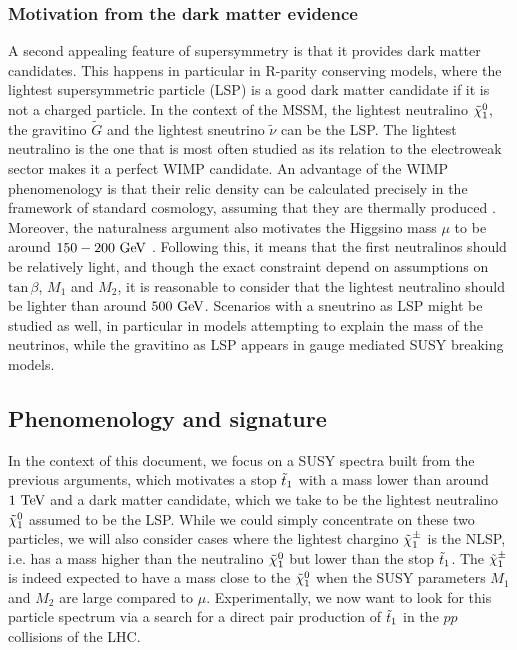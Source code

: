     \subsubsection{Motivation from the dark matter evidence}

    A second appealing feature of supersymmetry is that it provides dark matter
    candidates. This happens in particular in R-parity conserving models, where the
    lightest supersymmetric particle (LSP) is a good dark matter candidate if it is
    not a charged particle. In the context of the MSSM, the lightest neutralino
    $\tilde{\chi}_1^0$, the gravitino $\tilde{G}$ and the lightest sneutrino $\tilde{\nu}$
    can be the LSP. The lightest neutralino is the one that is most often studied as its
    relation to the electroweak sector makes it a perfect WIMP candidate.
    An advantage of the WIMP phenomenology is that their relic density can be calculated
    precisely in the framework of standard cosmology, assuming that they are thermally produced
    \cite{EllisDarkMatter}.
    Moreover, the naturalness argument also motivates the Higgsino mass $\mu$ to be around
    $150-200~\text{GeV}$ \cite{NaturalSUSYAndDarkMatter}. Following this, it means that the first
    neutralinos should be relatively light, and though the exact constraint
    depend on assumptions on $\text{tan}\, \beta$, $M_1$ and $M_2$, it is reasonable to
    consider that the lightest neutralino should be lighter than around $500~\text{GeV}$.
    Scenarios with a sneutrino as LSP might be studied as well, in particular in models
    attempting to explain the mass of the neutrinos, while the gravitino as LSP appears
    in gauge mediated SUSY breaking models.

    \subsection{Phenomenology and signature \label{sec:phenoAndSignature}}

    In the context of this document, we focus on a SUSY spectra built from the
    previous arguments, which motivates a stop $\tilde{t}_1$ with a mass lower than around
    $1~\text{TeV}$ and a dark matter candidate, which we take to be the lightest neutralino
    $\tilde{\chi}_1^0$ assumed to be the LSP. While we could simply concentrate on these
    two particles, we will also consider cases where the lightest chargino $\tilde{\chi}_1^\pm$
    is the NLSP, i.e. has a mass higher than the neutralino $\tilde{\chi}_1^0$ but lower
    than the stop $\tilde{t}_1$. The $\tilde{\chi}_1^\pm$ is indeed expected to have a mass close
    to the $\tilde{\chi}_1^0$ when the SUSY parameters $M_1$ and $M_2$
    are large compared to $\mu$. Experimentally, we now want to look for this particle
    spectrum via a search for a direct pair production of $\tilde{t}_1$ in the $pp$ collisions of the LHC.

